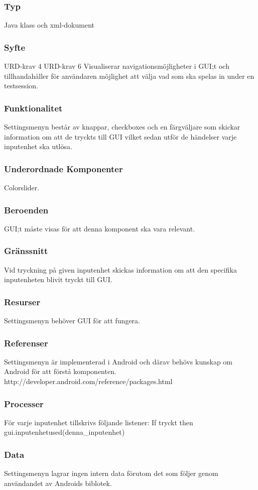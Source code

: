 \subsubsection{Typ}
Java klass och xml-dokument

\subsubsection{Syfte}
URD-krav 4
URD-krav 6
Visualiserar navigationsmöjligheter i GUI;t och tillhandahåller för användaren möjlighet att välja vad som ska spelas in under en testsession. 

\subsubsection{Funktionalitet}
Settingsmenyn består av knappar, checkboxes och en färgväljare som skickar information om att de tryckts till GUI vilket sedan utför de händelser varje inputenhet ska utlösa.

\subsubsection{Underordnade Komponenter}
Colorslider.

\subsubsection{Beroenden}
GUI;t måste visas för att denna komponent ska vara relevant.

\subsubsection{Gränssnitt}
Vid tryckning på given inputenhet skickas information om att den specifika inputenheten blivit tryckt till GUI.

\subsubsection{Resurser}
Settingsmenyn behöver GUI för att fungera.

\subsubsection{Referenser}
Settingsmenyn är implementerad i Android och därav behövs kunskap om Android för att förstå komponenten.
http://developer.android.com/reference/packages.html

\subsubsection{Processer}
För varje inputenhet tillskrivs följande listener:
If tryckt
then gui.inputenhetused(denna_inputenhet)

\subsubsection{Data}
Settingsmenyn lagrar ingen intern data förutom det som följer genom användandet av Androids biblotek.